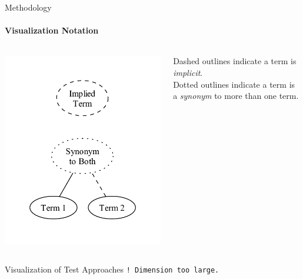 \begin{frame}[t]{Methodology}
    \framesubtitle{Visualization Notation}
    \begin{columns}[T]
        \begin{column}{.5\textwidth}
            \vspace{-0.5cm}
            \centering
            \includegraphics[width=\linewidth]{assets/graphs/manual/catRels8.pdf}
        \end{column}
        \begin{column}{.5\textwidth}
            \vspace{0.75cm}
            Dashed outlines indicate a term is \emph{implicit}.\\
            \vspace{1.3cm}
            Dotted outlines indicate a term is a \emph{synonym} to more than one term.
        \end{column}
    \end{columns}
\end{frame}

\begin{frame}{Visualization of Test Approaches}
    \pause \large \centering \texttt{! Dimension too large.}
\end{frame}

